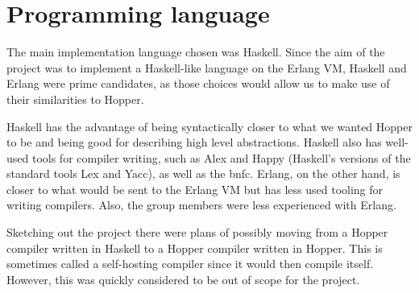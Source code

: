 \section{Programming language}

The main implementation language chosen was Haskell. Since the aim of the project was to implement a Haskell-like language on the Erlang VM, Haskell and Erlang were prime candidates, as those choices would allow us to make use of their similarities to Hopper.

Haskell has the advantage of being syntactically closer to what we wanted Hopper to be and being good for describing high level abstractions. Haskell also has well-used tools for compiler writing, such as Alex\cite{alex} and Happy\cite{happy} (Haskell's versions of the standard tools Lex\cite{lex} and Yacc\cite{yacc}), as well as the \gls{bnfc}. Erlang, on the other hand, is closer to what would be sent to the Erlang VM but has less used tooling for writing compilers. Also, the group members were less experienced with Erlang.

Sketching out the project there were plans of possibly moving from a Hopper compiler written in Haskell to a Hopper compiler written in Hopper. This is sometimes called a self-hosting compiler since it would then compile itself. However, this was quickly considered to be out of scope for the project.
